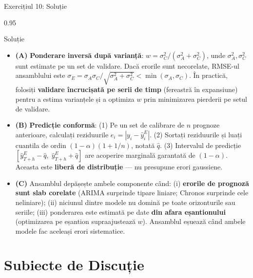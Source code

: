 \documentclass[9pt, aspectratio=169, t]{beamer}
\begin{document}
\begin{frame}{Exercițiul 10: Soluție}
    \begin{cminipage}{0.95\textwidth}
    \begin{exampleblock}{Soluție}
        {\scriptsize
        \begin{itemize}\setlength{\itemsep}{1pt}
            \item \textcolor{MainBlue}{\textbf{(A)}} \textbf{Ponderare inversă după varianță}: $w = \sigma_C^2 / (\sigma_A^2 + \sigma_C^2)$, unde $\sigma_A^2, \sigma_C^2$ sunt estimate pe un set de validare. Dacă erorile sunt necorelate, RMSE-ul ansamblului este $\sigma_E = \sigma_A \sigma_C / \sqrt{\sigma_A^2 + \sigma_C^2} < \min(\sigma_A, \sigma_C)$. În practică, folosiți \textbf{validare încrucișată pe serii de timp} (fereastră în expansiune) pentru a estima varianțele și a optimiza $w$ prin minimizarea pierderii pe setul de validare.
            \item \textcolor{MainBlue}{\textbf{(B)}} \textbf{Predicție conformă}: (1) Pe un set de calibrare de $n$ prognoze anterioare, calculați reziduurile $e_i = |y_i - \hat{y}^{E}_i|$. (2) Sortați reziduurile și luați cuantila de ordin $(1-\alpha)(1 + 1/n)$, notată $\hat{q}$. (3) Intervalul de predicție $[\hat{y}^{E}_{T+h} - \hat{q},\; \hat{y}^{E}_{T+h} + \hat{q}]$ are acoperire marginală garantată de $(1-\alpha)$. Aceasta este \textbf{liberă de distribuție} --- nu presupune erori gaussiene.
            \item \textcolor{MainBlue}{\textbf{(C)}} Ansamblul depășește ambele componente când: (i) \textbf{erorile de prognoză sunt slab corelate} (ARIMA surprinde tipare liniare; Chronos surprinde cele neliniare); (ii) niciunul dintre modele nu domină pe toate orizonturile sau seriile; (iii) ponderarea este estimată pe date \textbf{din afara eșantionului} (optimizarea pe eșantion supraajustează $w$). Ansamblul eșuează când ambele modele fac aceleași erori sistematice.
        \end{itemize}
        }
    \end{exampleblock}
    \end{cminipage}
\end{frame}

\section{Subiecte de Discuție}
\end{document}
